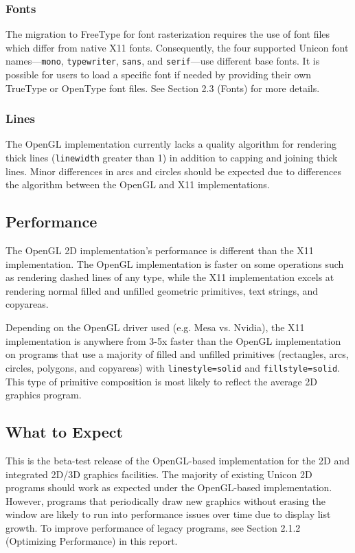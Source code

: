 \documentclass[letterpaper,12pt]{article}
\begin{document}
\subsubsection{Fonts}

The migration to FreeType for font rasterization requires the use of font files 
which differ from native X11 fonts. Consequently, the four supported Unicon 
font names---\texttt{mono}, \texttt{typewriter}, \texttt{sans}, and 
\texttt{serif}---use different base fonts. It is possible for users to load 
a specific font if needed by providing their own TrueType or OpenType font 
files. See Section 2.3 (Fonts) for more details.

\subsubsection{Lines}

The OpenGL implementation currently lacks a quality algorithm for rendering
thick lines (\texttt{linewidth} greater than 1) in addition to capping
and joining thick lines. Minor differences in arcs and circles
should be expected due to differences the algorithm between the OpenGL and
X11 implementations.

\subsection{Performance}

The OpenGL 2D implementation's performance is different than the 
X11 implementation. The OpenGL implementation is faster on some operations
such as rendering dashed lines of any type, while the X11 implementation excels
at rendering normal filled and unfilled geometric primitives, text strings,
and copyareas. 

Depending on the OpenGL driver used (e.g. Mesa vs. Nvidia),
the X11 implementation is anywhere from 3-5x faster than the OpenGL
implementation on programs that use a majority of filled and unfilled
primitives (rectangles, arcs, circles, polygons, and copyareas) with
\texttt{linestyle=solid} and \texttt{fillstyle=solid}. This type of
primitive composition is most likely to reflect the average 2D graphics
program.

\subsection{What to Expect}

This is the beta-test release of the OpenGL-based implementation for the
2D and integrated 2D/3D graphics facilities. The majority of existing Unicon
2D programs should work as expected under the OpenGL-based implementation.
However, programs that periodically draw new graphics without erasing the
window are likely to run into performance issues over time
due to display list growth. To improve performance
of legacy programs, see Section 2.1.2 (Optimizing Performance) in this
report. 
\end{document}
